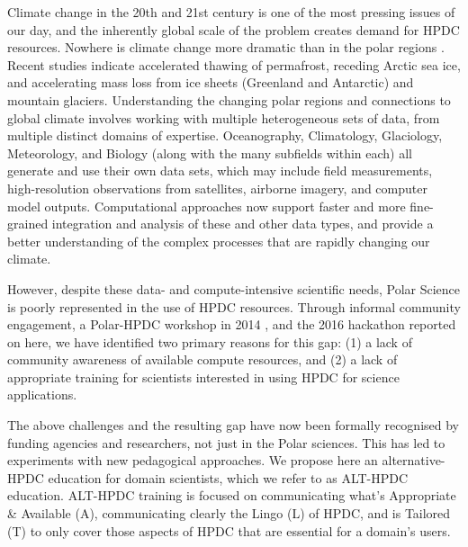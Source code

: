 \documentclass[conference]{IEEEtran}
\begin{document}
Climate change in the 20th and 21st century is one of the most pressing issues of our day, and the inherently global scale of the problem creates demand for HPDC resources. Nowhere is climate change more dramatic than in the polar regions \cite{Nelson2007}. Recent studies indicate accelerated thawing of permafrost, receding Arctic sea ice, and accelerating mass loss from ice sheets (Greenland and Antarctic) and mountain glaciers. Understanding the changing polar regions and connections to global climate involves working with multiple heterogeneous sets of data, from multiple distinct domains of expertise. Oceanography, Climatology, Glaciology, Meteorology, and Biology (along with the many subfields within each) all generate and use their own data sets, which may include field measurements, high-resolution observations from satellites, airborne imagery, and computer model outputs. Computational approaches now support faster and more fine-grained integration and analysis of these and other data types, and provide a better understanding of the complex processes that are rapidly changing our climate.  

However, despite these data- and compute-intensive scientific needs, Polar Science is poorly represented in the use of HPDC resources. Through informal community engagement, a Polar-HPDC workshop in 2014 \cite{Workshop2014}, and the 2016 hackathon reported on here, we have identified two primary reasons for this gap: (1) a lack of community awareness of available compute resources, and (2) a lack of appropriate training for scientists interested in using HPDC for science applications. 

The above challenges and the resulting gap have now been formally recognised by funding agencies and researchers, not just in the Polar sciences. This has led to experiments with new pedagogical approaches. We propose here an alternative-HPDC education for domain scientists, which we refer to as ALT-HPDC education. ALT-HPDC training is focused on communicating what’s Appropriate \& Available (A), communicating clearly the Lingo (L) of HPDC, and is Tailored (T) to only cover those aspects of HPDC that are essential for a domain’s users. 
\end{document}
